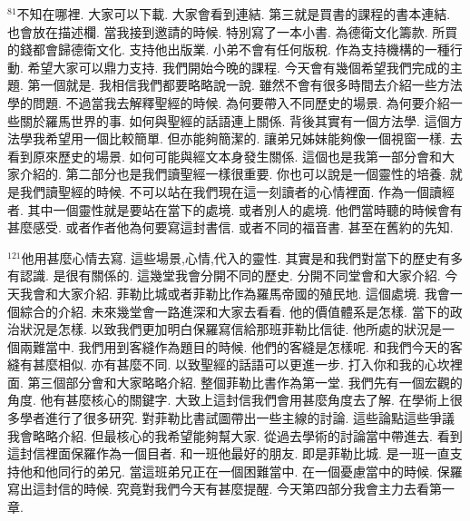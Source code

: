 \documentclass{book}
\begin{document}
$^{81}$不知在哪裡.
大家可以下載.
大家會看到連結.
第三就是買書的課程的書本連結.
也會放在描述欄.
當我接到邀請的時候.
特別寫了一本小書.
為德衛文化籌款.
所買的錢都會歸德衛文化.
支持他出版業.
小弟不會有任何版稅.
作為支持機構的一種行動.
希望大家可以鼎力支持.
我們開始今晚的課程.
今天會有幾個希望我們完成的主題.
第一個就是.
我相信我們都要略略說一說.
雖然不會有很多時間去介紹一些方法學的問題.
不過當我去解釋聖經的時候.
為何要帶入不同歷史的場景.
為何要介紹一些關於羅馬世界的事.
如何與聖經的話語連上關係.
背後其實有一個方法學.
這個方法學我希望用一個比較簡單.
但亦能夠簡潔的.
讓弟兄姊妹能夠像一個視窗一樣.
去看到原來歷史的場景.
如何可能與經文本身發生關係.
這個也是我第一部分會和大家介紹的.
第二部分也是我們讀聖經一樣很重要.
你也可以說是一個靈性的培養.
就是我們讀聖經的時候.
不可以站在我們現在這一刻讀者的心情裡面.
作為一個讀經者.
其中一個靈性就是要站在當下的處境.
或者別人的處境.
他們當時聽的時候會有甚麼感受.
或者作者他為何要寫這封書信.
或者不同的福音書.
甚至在舊約的先知.

$^{121}$他用甚麼心情去寫.
這些場景,心情,代入的靈性.
其實是和我們對當下的歷史有多有認識.
是很有關係的.
這幾堂我會分開不同的歷史.
分開不同堂會和大家介紹.
今天我會和大家介紹.
菲勒比城或者菲勒比作為羅馬帝國的殖民地.
這個處境.
我會一個綜合的介紹.
未來幾堂會一路進深和大家去看看.
他的價值體系是怎樣.
當下的政治狀況是怎樣.
以致我們更加明白保羅寫信給那班菲勒比信徒.
他所處的狀況是一個兩難當中.
我們用到客縫作為題目的時候.
他們的客縫是怎樣呢.
和我們今天的客縫有甚麼相似.
亦有甚麼不同.
以致聖經的話語可以更進一步.
打入你和我的心坎裡面.
第三個部分會和大家略略介紹.
整個菲勒比書作為第一堂.
我們先有一個宏觀的角度.
他有甚麼核心的關鍵字.
大致上這封信我們會用甚麼角度去了解.
在學術上很多學者進行了很多研究.
對菲勒比書試圖帶出一些主線的討論.
這些論點這些爭議我會略略介紹.
但最核心的我希望能夠幫大家.
從過去學術的討論當中帶進去.
看到這封信裡面保羅作為一個目者.
和一班他最好的朋友.
即是菲勒比城.
是一班一直支持他和他同行的弟兄.
當這班弟兄正在一個困難當中.
在一個憂慮當中的時候.
保羅寫出這封信的時候.
究竟對我們今天有甚麼提醒.
今天第四部分我會主力去看第一章.
\end{document}
